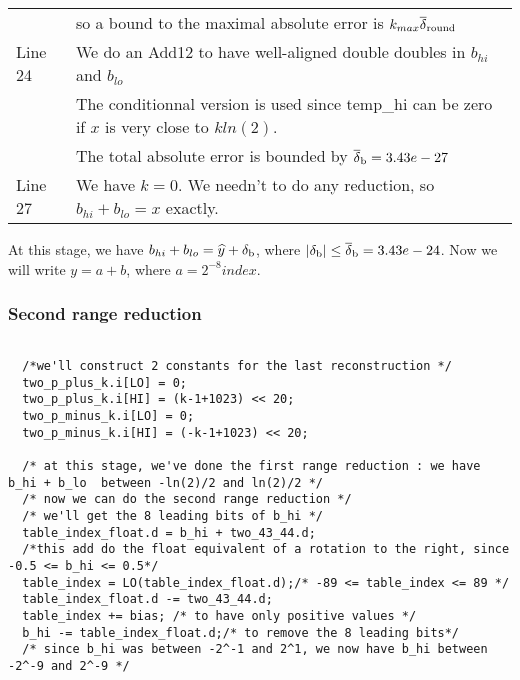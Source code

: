 \begin{tabular}{ll}
        & so a bound to the maximal absolute error is $k_{max} {\overline{\delta}}_{\mathrm{round}}$\\
Line 24 & We do an Add12 to have well-aligned double doubles in $b_{hi}$ and $b_{lo}$\\
        & The conditionnal version is used since temp\_hi  can be zero if $x$ is very close to $k ln(2)$.\\
        & The total absolute error is bounded by ${\overline{\delta}}_{\mathrm{b}} = 3.43e-27$ \\
Line 27 & We have $k = 0$. We needn't to do any reduction, so $b_{hi} + b_{lo} = x$ exactly.\\
\end{tabular}

At this stage, we have $b_{hi} + b_{lo} = \widehat{y} + \delta_{\mathrm{b}}$, where $|\delta_{\mathrm{b}}| \leq {\overline{\delta}}_{\mathrm{b}} = 3.43e-24$. Now we will write $y = a + b$, where $a = 2^{-8}  index$. 

\subsubsection{Second range reduction}

\begin{lstlisting}[caption={Procedure \texttt{cosh\_quick} - second range reduction},firstnumber=29]

  /*we'll construct 2 constants for the last reconstruction */
  two_p_plus_k.i[LO] = 0;
  two_p_plus_k.i[HI] = (k-1+1023) << 20;
  two_p_minus_k.i[LO] = 0;
  two_p_minus_k.i[HI] = (-k-1+1023) << 20;

  /* at this stage, we've done the first range reduction : we have b_hi + b_lo  between -ln(2)/2 and ln(2)/2 */
  /* now we can do the second range reduction */
  /* we'll get the 8 leading bits of b_hi */
  table_index_float.d = b_hi + two_43_44.d;
  /*this add do the float equivalent of a rotation to the right, since -0.5 <= b_hi <= 0.5*/
  table_index = LO(table_index_float.d);/* -89 <= table_index <= 89 */
  table_index_float.d -= two_43_44.d;
  table_index += bias; /* to have only positive values */
  b_hi -= table_index_float.d;/* to remove the 8 leading bits*/
  /* since b_hi was between -2^-1 and 2^1, we now have b_hi between -2^-9 and 2^-9 */  
\end{lstlisting}


